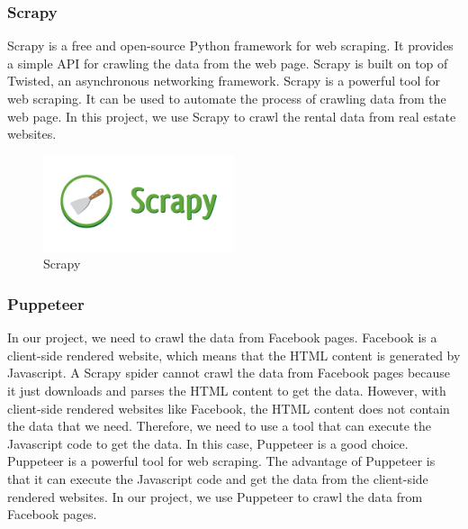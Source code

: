 \subsubsection{Scrapy}
Scrapy is a free and open-source Python framework for web scraping. It provides a simple API for crawling the data from the web page. Scrapy is built on top of Twisted, an asynchronous networking framework. Scrapy is a powerful tool for web scraping. It can be used to automate the process of crawling data from the web page. In this project, we use Scrapy to crawl the rental data from real estate websites.
\begin{figure}[ht]
    \centering
    \includegraphics[width=0.5\textwidth]{../Images/8.Technology_Stack/scrapy.png}
    \caption{Scrapy}
    \label{fig:scrapy}
\end{figure}

\subsubsection{Puppeteer}
In our project, we need to crawl the data from Facebook pages. Facebook is a client-side rendered website, which means that the HTML content is generated by Javascript. A Scrapy spider cannot crawl the data from Facebook pages because it just downloads and parses the HTML content to get the data. However, with client-side rendered websites like Facebook, the HTML content does not contain the data that we need. Therefore, we need to use a tool that can execute the Javascript code to get the data. In this case, Puppeteer is a good choice. Puppeteer is a powerful tool for web scraping. The advantage of Puppeteer is that it can execute the Javascript code and get the data from the client-side rendered websites. In our project, we use Puppeteer to crawl the data from Facebook pages.


